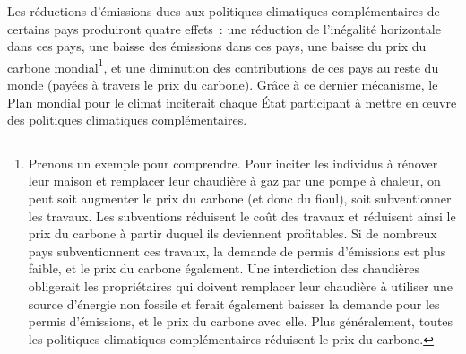 \documentclass[a5paper,french,openany]{memoir}
\begin{document}
Les réductions d'émissions dues aux politiques climatiques complémentaires de certains pays 
produiront quatre effets~: une réduction de l'inégalité horizontale dans ces pays, une baisse des émissions dans ces pays, une baisse du prix du carbone mondial\footnote{Prenons un exemple pour comprendre. 
Pour inciter les individus à rénover leur maison et remplacer leur chaudière à gaz par une pompe à chaleur, on peut soit augmenter le prix du carbone (et donc du fioul), soit subventionner les travaux. 
Les subventions réduisent le coût des travaux et réduisent ainsi le prix du carbone à partir duquel ils deviennent profitables. 
Si de nombreux pays subventionnent ces travaux, %
la demande de permis d'émissions est plus faible, et le prix du carbone également. 
Une interdiction des chaudières obligerait les propriétaires qui doivent remplacer leur chaudière à utiliser une source d'énergie non fossile et ferait également baisser la demande pour les permis d'émissions, et le prix du carbone avec elle. Plus généralement, toutes les politiques climatiques complémentaires réduisent le prix du carbone.}, 
et une diminution des contributions de ces pays au reste du monde (payées à travers le prix du carbone). Grâce à ce dernier mécanisme, le Plan mondial pour le climat inciterait chaque État participant à mettre en œuvre des politiques climatiques complémentaires. 
\end{document}
